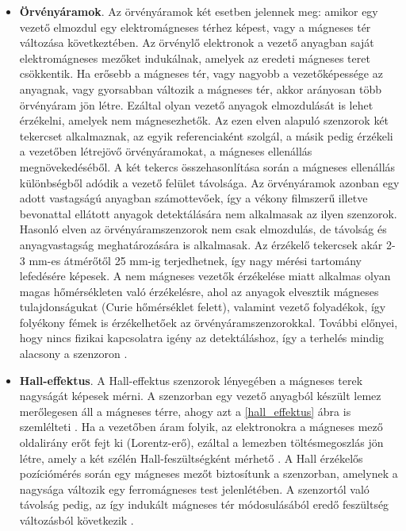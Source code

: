 \begin{itemize}
	\item \textbf{Örvényáramok}. Az örvényáramok két esetben jelennek meg: amikor egy vezető elmozdul egy elektromágneses térhez képest, vagy a mágneses tér változása következtében. Az örvénylő elektronok a vezető anyagban saját elektromágneses mezőket indukálnak, amelyek az eredeti mágneses teret csökkentik. Ha erősebb a mágneses tér, vagy nagyobb a vezetőképessége az anyagnak, vagy gyorsabban változik a mágneses tér, akkor arányosan több örvényáram jön létre. Ezáltal olyan vezető anyagok elmozdulását is lehet érzékelni, amelyek nem mágnesezhetők. Az ezen elven alapuló szenzorok két tekercset alkalmaznak, az egyik referenciaként szolgál, a másik pedig érzékeli a vezetőben létrejövő örvényáramokat, a mágneses ellenállás megnövekedéséből. A két tekercs összehasonlítása során a mágneses ellenállás különbségből adódik a vezető felület távolsága. Az örvényáramok azonban egy adott vastagságú anyagban számottevőek, így a vékony filmszerű illetve bevonattal ellátott anyagok detektálására nem alkalmasak az ilyen szenzorok. Hasonló elven az örvényáramszenzorok nem csak elmozdulás, de távolság és anyagvastagság meghatározására is alkalmasak. Az érzékelő tekercsek akár 2-3 mm-es átmérőtől 25 mm-ig terjedhetnek, így nagy mérési tartomány lefedésére képesek. A nem mágneses vezetők érzékelése miatt alkalmas olyan magas hőmérsékleten való érzékelésre, ahol az anyagok elvesztik mágneses tulajdonságukat (Curie hőmérséklet felett), valamint vezető folyadékok, így folyékony fémek is érzékelhetőek az örvényáramszenzorokkal. További előnyei, hogy nincs fizikai kapcsolatra igény az detektáláshoz, így a terhelés mindig alacsony a szenzoron \cite{Fraden2016a}.
	\item \textbf{Hall-effektus}. A Hall-effektus szenzorok lényegében a mágneses terek nagyságát képesek mérni. A szenzorban egy vezető anyagból készült lemez merőlegesen áll a mágneses térre, ahogy azt a \ref{hall_effektus} ábra is szemlélteti \cite{Morris2016}. Ha a vezetőben áram folyik, az elektronokra a mágneses mező oldalirány erőt fejt ki (Lorentz-erő), ezáltal a lemezben töltésmegoszlás jön létre, amely a két szélén Hall-feszültségként mérhető \cite{Fraden2016}. A Hall érzékelős pozíciómérés során egy mágneses mezőt biztosítunk a szenzorban, amelynek a nagysága változik egy ferromágneses test jelenlétében. A szenzortól való távolság pedig, az így indukált mágneses tér módosulásából eredő feszültség változásból következik \cite{Morris2016}. 
	\begin{figure}
		\centering

\end{figure}
\end{itemize}

